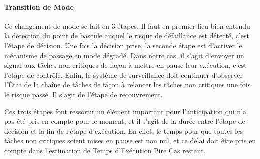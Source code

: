 \documentclass[french, a4paper, 11pt, twoside, pdftex]{StyleThese}
\begin{document}

	\paragraph{Transition de Mode}
    Ce changement de mode se fait en 3 étapes. Il faut en premier lieu bien entendu la détection du point de bascule auquel le risque de défaillance est détecté, c'est l'étape de décision. Une fois la décision prise, la seconde étape est d'activer le mécanisme de passage en mode dégradé. Dans notre cas, il s'agit d'envoyer un signal aux tâches non critiques de façon à mettre en pause leur exécution, c'est l'étape de contrôle. Enfin, le système de surveillance doit continuer d'observer l'État de la chaîne de tâches de façon à relancer les tâches non critiques une fois le risque passé. Il s'agit de l'étape de recouvrement.
    
    Ces trois étapes font ressortir un élément important pour l'anticipation qui n'a pas été pris en compte pour le moment, et il s'agit de la durée entre l'étape de décision et la fin de l'étape d'exécution. En effet, le temps pour que toutes les tâches non critiques soient mises en pause est non nul, et ce délai doit être pris en compte dans l'estimation de Temps d'Exécution Pire Cas restant. %
    
\end{document}
